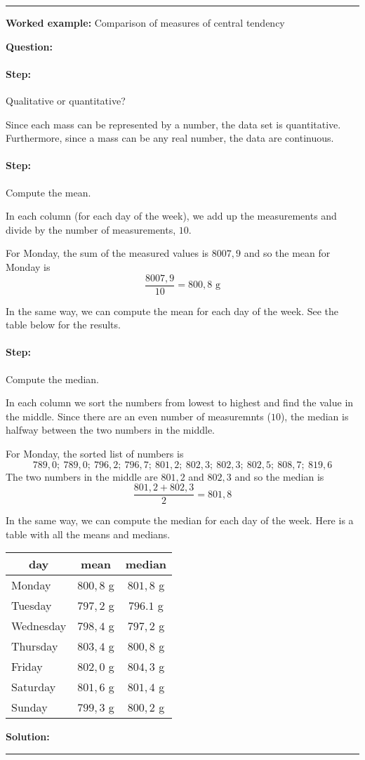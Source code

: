 \documentclass[a4paper,11pt]{report}
\newenvironment{wex}[3]%
{\rule{\linewidth}{0.5mm}
\textbf{Worked example:} #1

\textbf{Question:} #2

\textbf{Solution:} #3}%
{\rule{\linewidth}{0.5mm}}
\newcommand{\westep}[1]{\paragraph{Step:} #1}
\begin{document}
\begin{wex}{Comparison of measures of central tendency}
{  \westep{Qualitative or quantitative?}

  Since each mass can be represented by a number, the data
  set is quantitative. Furthermore, since a mass can be any real
  number, the data are continuous.

  \westep{Compute the mean.}

  In each column (for each day of the week), we add up the
  measurements and divide by the number of measurements, $10$.

  For Monday, the sum of the measured values is $8007,9$ and so the
  mean for Monday is
  \begin{equation}
    \frac{8007,9}{10} = 800,8\textrm{ g}
  \end{equation}

  In the same way, we can compute the mean for each day of the
  week. See the table below for the results.

  \westep{Compute the median.}

  In each column we sort the numbers from lowest to highest and find
  the value in the middle. Since there are an even number of
  measuremnts ($10$), the median is halfway between the two numbers in
  the middle.

  For Monday, the sorted list of numbers is
  \begin{equation}
    789,0;\ 789,0;\ 796,2;\ 796,7;\ 801,2;\ 802,3;\ 802,3;\ 802,5;\ 808,7;\ 819,6
  \end{equation}
  The two numbers in the middle are $801,2$ and $802,3$ and so the
  median is
  \begin{equation}
    \frac{801,2 + 802,3}{2} = 801,8
  \end{equation}

  In the same way, we can compute the median for each day of the
  week. Here is a table with all the means and medians.

  \begin{center}
    \begin{tabular}{lcc}
      \toprule
      \multicolumn{1}{c}{day} & mean & median \\
      \midrule
      Monday & $800,8$ g & $801,8$ g \\
      Tuesday & $797,2$ g & $796.1$ g \\
      Wednesday & $798,4$ g & $797,2$ g \\
      Thursday & $803,4$ g & $800,8$ g \\
      Friday & $802,0$ g & $804,3$ g \\
      Saturday & $801,6$ g & $801,4$ g \\
      Sunday & $799,3$ g & $800,2$ g \\
      \bottomrule
    \end{tabular}
  \end{center}

}
\end{wex}
\end{document}
